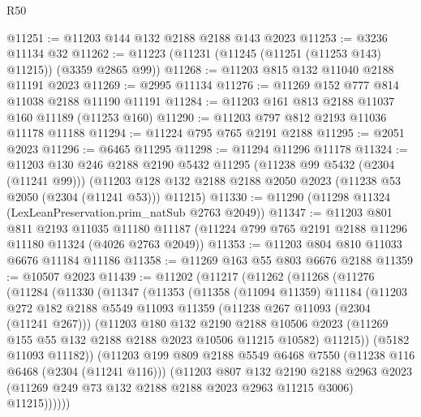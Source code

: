 \begin{lexlean}{R50}
\begin{coremodule}
@11251 := @11203 @144 @132 @2188 @2188 @143 @2023
@11253 := @3236 @11134 @32
@11262 := @11223 (@11231 (@11245 (@11251 (@11253 @143) @11215)) (@3359 @2865 @99))
@11268 := @11203 @815 @132 @11040 @2188 @11191 @2023
@11269 := @2995 @11134
@11276 := @11269 @152 @777 @814 @11038 @2188 @11190 @11191
@11284 := @11203 @161 @813 @2188 @11037 @160 @11189 (@11253 @160)
@11290 := @11203 @797 @812 @2193 @11036 @11178 @11188
@11294 := @11224 @795 @765 @2191 @2188
@11295 := @2051 @2023
@11296 := @6465 @11295
@11298 := @11294 @11296 @11178
@11324 := @11203
    @130
    @246
    @2188
    @2190
    @5432
    @11295
    (@11238 @99 @5432 (@2304 (@11241 @99)))
    (@11203 @128 @132 @2188 @2188 @2050 @2023 (@11238 @53 @2050 (@2304 (@11241 @53))) @11215)
@11330 := @11290 (@11298 @11324 (LexLeanPreservation.prim_natSub @2763 @2049))
@11347 := @11203
    @801
    @811
    @2193
    @11035
    @11180
    @11187
    (@11224 @799 @765 @2191 @2188 @11296 @11180 @11324 (@4026 @2763 @2049))
@11353 := @11203 @804 @810 @11033 @6676 @11184 @11186
@11358 := @11269 @163 @55 @803 @6676 @2188
@11359 := @10507 @2023
@11439 := @11202
    (@11217
      (@11262
        (@11268
          (@11276
            (@11284
              (@11330
                (@11347
                  (@11353
                    (@11358
                      (@11094 @11359)
                      @11184
                      (@11203
                        @272
                        @182
                        @2188
                        @5549
                        @11093
                        @11359
                        (@11238 @267 @11093 (@2304 (@11241 @267)))
                        (@11203
                          @180
                          @132
                          @2190
                          @2188
                          @10506
                          @2023
                          (@11269 @155 @55 @132 @2188 @2188 @2023 @10506 @11215 @10582)
                          @11215))
                      (@5182 @11093 @11182))
                    (@11203
                      @199
                      @809
                      @2188
                      @5549
                      @6468
                      @7550
                      (@11238 @116 @6468 (@2304 (@11241 @116)))
                      (@11203
                        @807
                        @132
                        @2190
                        @2188
                        @2963
                        @2023
                        (@11269 @249 @73 @132 @2188 @2188 @2023 @2963 @11215 @3006)
                        @11215))))))

\end{coremodule}
\end{lexlean}
